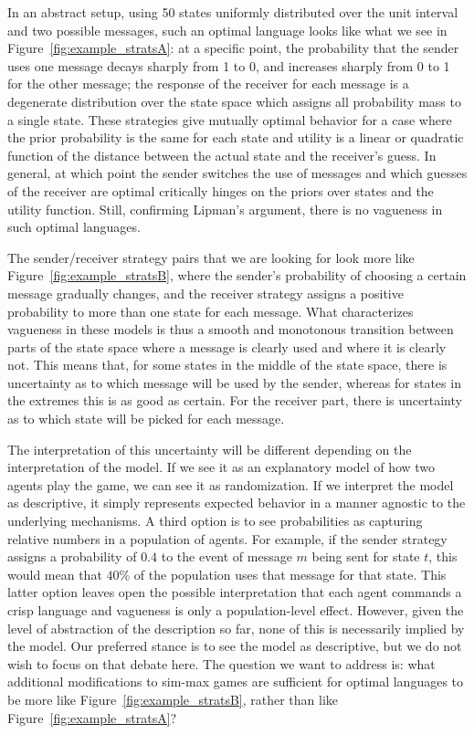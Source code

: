 \documentclass[a4paper]{article}
\begin{document}
In an abstract setup, using 50 states uniformly distributed over the unit interval and two possible messages, such an optimal language looks like what we see in Figure~\ref{fig:example_stratsA}: at a specific point, the probability that the sender uses one message decays sharply from 1 to 0, and increases sharply from 0 to 1 for the other message; the response of the receiver for each message is a degenerate distribution over the state space which assigns all probability mass to a single state.
These strategies give mutually optimal behavior for a case where the prior probability is the same for each state and utility is a linear or quadratic function of the distance between the actual state and the receiver's guess.
In general, at which point the sender switches the use of messages and which guesses of the receiver are optimal critically hinges on the priors over states and the utility function.
Still, confirming Lipman's argument, there is no vagueness in such optimal languages.

The sender/receiver strategy pairs that we are looking for look more like Figure~\ref{fig:example_stratsB}, where the sender's probability of choosing a certain message gradually changes, and the receiver strategy assigns a positive probability to more than one state for each message.
What characterizes vagueness in these models is thus a smooth and monotonous transition between parts of the state space where a message is clearly used and where it is clearly not.
This means that, for some states in the middle of the state space, there is uncertainty as to which message will be used by the sender, whereas for states in the extremes this is as good as certain.
For the receiver part, there is uncertainty as to which state will be picked for each message.

The interpretation of this uncertainty will be different depending on the interpretation of the model.
If we see it as an explanatory model of how two agents play the game, we can see it as randomization.
If we interpret the model as descriptive, it simply represents expected behavior in a manner agnostic to the underlying mechanisms.
A third option is to see probabilities as capturing relative numbers in a population of agents.
For example, if the sender strategy assigns a probability of $0.4$ to the event of message $m$ being sent for state $t$, this would mean that $40\%$ of the population uses that message for that state.
This latter option leaves open the possible interpretation that each agent commands a crisp language and vagueness is only a population-level effect.
However, given the level of abstraction of the description so far, none of this is necessarily implied by the model.
Our preferred stance is to see the model as descriptive, but we do not wish to focus on that debate here.
The question we want to address is: what additional modifications to sim-max games are sufficient for optimal languages to be more like Figure~\ref{fig:example_stratsB}, rather than like Figure~\ref{fig:example_stratsA}?
\end{document}
